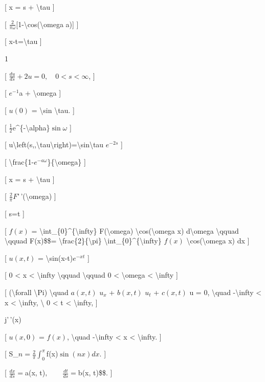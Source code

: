 \documentclass[
]{article}
\begin{document}
{{{[} x = s + \textbackslash tau {]}

{[} \(\frac{2}{\pi\omega}\){[}1-\textbackslash cos(\textbackslash omega
a){]} {]}

{[} x-t=\textbackslash tau {]}

1

{[} \(\frac{du}{ds} + 2u = 0, \quad 0 < s < \infty\), {]}

{[} \(e^{-1}\)a + \textbackslash omega {]}

{[} \(u(0)\) = \textbackslash sin \textbackslash tau. {]}

{[} \(\frac{1}{2}\)e\^{}\{-\textbackslash alpha\}\(\sin\omega\) {]}

{[}
u\textbackslash left(s,,\textbackslash tau\textbackslash right)=\textbackslash sin\textbackslash tau
\(e^{-2s}\) {]}

{[} \textbackslash frac\{1-\(e^{-a\omega}\)\}\{\textbackslash omega\}
{]}

{[} x = s + \textbackslash tau {]}

{[} \(\frac{2}{\pi}F\)'\,'(\textbackslash omega) {]}

{[} s=t {]}

{[} \(f(x)\) = \textbackslash int\_\{0\}\^{}\{\textbackslash infty\}
F(\textbackslash omega) \textbackslash cos(\textbackslash omega x)
d\textbackslash omega \textbackslash qquad \textbackslash qquad
F(x)\$\$= \textbackslash frac\{2\}\{\textbackslash pi\}
\textbackslash int\_\{0\}\^{}\{\textbackslash infty\} \(f(x)\)
\textbackslash cos(\textbackslash omega x) dx {]}

{[} \(u(x, t)\) = \textbackslash sin(x-t)\(e^{-xt}\) {]}

{[} 0 \textless{} x \textless{} \textbackslash infty
\textbackslash qquad \textbackslash qquad 0 \textless{}
\textbackslash omega \textless{} \textbackslash infty {]}

{[} (\textbackslash forall \textbackslash Pi) \textbackslash quad
\(a(x, t)\) \(u_x\) + \(b(x, t)\) \(u_t\) + \(c(x, t)\) u = 0,
\textbackslash quad -\textbackslash infty \textless{} x \textless{}
\textbackslash infty, \textbackslash{} 0 \textless{} t \textless{}
\textbackslash infty, {]}

j'\,'(x)

{[} \(u(x, 0)\) = \(f(x)\), \textbackslash quad -\textbackslash infty
\textless{} x \textless{} \textbackslash infty. {]}

{[} S\_\(n = \frac{2}{\pi} \int_0^{\pi}\)f(x)\(\sin(nx) dx\). {]}

{[} \(\frac{dx}{ds} =\)a(x, t)\(, \qquad \frac{dt}{ds} =\)b(x, t)\$\$.
{]}

}}
\end{document}
